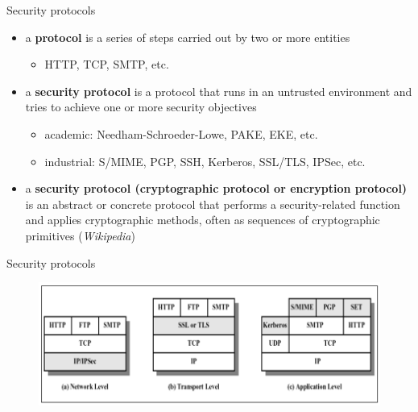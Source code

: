 \documentclass[pdf]{beamer}
\begin{document}
\begin{frame}{Security protocols}
\begin{itemize}
\item
a \textbf{protocol} is a series of steps carried out by two or more entities

\begin{itemize}
\item
HTTP, TCP, SMTP, etc.
\end{itemize}

\item
a \textbf{security protocol} is a protocol that runs in an untrusted  environment and tries to achieve one or more security objectives

\begin{itemize}
\item
academic: Needham-Schroeder-Lowe, PAKE, EKE, etc.

\item
industrial: S/MIME, PGP, SSH, Kerberos, SSL/TLS, IPSec, etc.
\newline
\end{itemize}


\item
a \textbf{security protocol (cryptographic protocol or encryption protocol)} is an abstract or concrete protocol that performs a security-related function and applies cryptographic methods, often as sequences of cryptographic primitives (\textit{Wikipedia})
\end{itemize}
\end{frame}



\begin{frame}{Security protocols}

\begin{figure}[t]
\centering
\includegraphics[scale=0.6]{Images/secpro}
\end{figure}

\end{frame}
\end{document}
